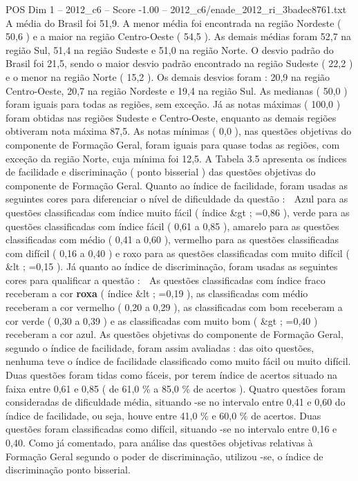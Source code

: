 \begin{textsample}{POS Dim 1 – 2012\_c6 – Score -1.00 – 2012\_c6/enade\_2012\_ri\_3badec8761.txt}
A média do Brasil foi 51,9.
A menor média foi encontrada na região Nordeste ( 50,6 ) e a maior na região Centro-Oeste ( 54,5 ).
As demais médias foram 52,7 na região Sul, 51,4 na região Sudeste e 51,0 na região Norte.
O desvio padrão do Brasil foi 21,5, sendo o maior desvio padrão encontrado na região Sudeste ( 22,2 ) e o menor na região Norte ( 15,2 ).
Os demais desvios foram : 20,9 na região Centro-Oeste, 20,7 na região Nordeste e 19,4 na região Sul.
As medianas ( 50,0 ) foram iguais para todas as regiões, sem exceção.
Já as notas máximas ( 100,0 ) foram obtidas nas regiões Sudeste e Centro-Oeste, enquanto as demais regiões obtiveram nota máxima 87,5.
As notas mínimas ( 0,0 ), nas questões objetivas do componente de Formação Geral, foram iguais para quase todas as regiões, com exceção da região Norte, cuja mínima foi 12,5.
A Tabela 3.5 apresenta os índices de facilidade e discriminação ( ponto bisserial ) das questões objetivas do componente de Formação Geral.
Quanto ao índice de facilidade, foram usadas as seguintes cores para diferenciar o nível de dificuldade da questão :  Azul para as questões classificadas com índice muito fácil ( índice \&gt ; =0,86 ), verde para as questões classificadas com índice fácil ( 0,61 a 0,85 ), amarelo para as questões classificadas com médio ( 0,41 a 0,60 ), vermelho para as questões classificadas com difícil ( 0,16 a 0,40 ) e roxo para as questões classificadas com muito difícil ( \&lt ; =0,15 ).
Já quanto ao índice de discriminação, foram usadas as seguintes cores para qualificar a questão :  As questões classificadas com índice fraco receberam a cor \textbf{roxa} ( índice \&lt ; =0,19 ), as classificadas com médio receberam a cor vermelho ( 0,20 a 0,29 ), as classificadas com bom receberam a cor verde ( 0,30 a 0,39 ) e as classificadas com muito bom ( \&gt ; =0,40 ) receberam a cor azul.
As questões objetivas do componente de Formação Geral, segundo o índice de facilidade, foram assim avaliadas : das oito questões, nenhuma teve o índice de facilidade classificado como muito fácil ou muito difícil.
Duas questões foram tidas como fáceis, por terem índice de acertos situado na faixa entre 0,61 e 0,85 ( de 61,0 \% a 85,0 \% de acertos ).
Quatro questões foram consideradas de dificuldade média, situando -se no intervalo entre 0,41 e 0,60 do índice de facilidade, ou seja, houve entre 41,0 \% e 60,0 \% de acertos.
Duas questões foram classificadas como difícil, situando -se no intervalo entre 0,16 e 0,40.
Como já comentado, para análise das questões objetivas relativas à Formação Geral segundo o poder de discriminação, utilizou -se, o índice de discriminação ponto bisserial.

\end{textsample}
